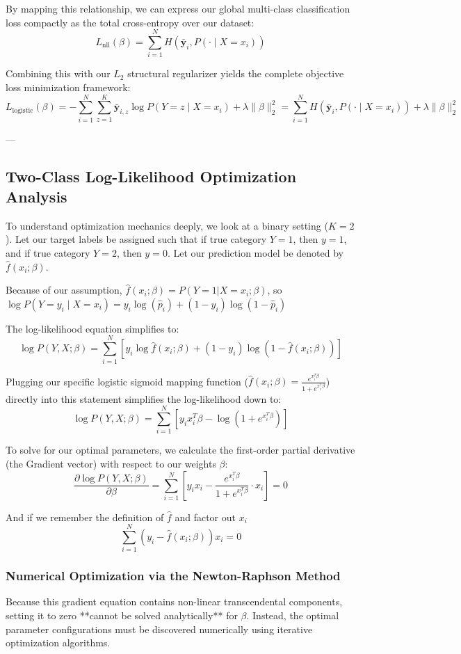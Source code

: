 \documentclass{article}
\begin{document}
By mapping this relationship, we can express our global multi-class classification loss compactly as the total cross-entropy over our dataset:
\[ L_{\text{nll}}(\beta) = \sum_{i=1}^{N} H\left(\mathbf{\bar{y}}_i, P(\cdot \mid X = x_i)\right) \]



Combining this with our $L_2$ structural regularizer yields the complete objective loss minimization framework:
\[ L_{\text{logistic}}(\beta) = -\sum_{i=1}^{N} \sum_{z=1}^{K} \mathbf{\bar{y}}_{i,z} \log P(Y = z \mid X = x_i) + \lambda \|\beta\|_2^2 = \sum_{i=1}^{N} H\left(\mathbf{\bar{y}}_i, P(\cdot \mid X = x_i)\right) + \lambda \|\beta\|_2^2 \]

---

\subsection{Two-Class Log-Likelihood Optimization Analysis}
To understand optimization mechanics deeply, we look at a binary setting ($K=2$). Let our target labels be assigned such that if true category $Y = 1$, then $y = 1$, and if true category $Y = 2$, then $y = 0$. Let our prediction model be denoted by $\hat{f}(x_i; \beta)$. 

Because of our assumption, $\hat{f}(x_i; \beta) = P(Y = 1 | X = x_i ; \beta)$, so $\log P(Y = y_i \mid X = x_i) = y_i \log(\hat{p}_i) + (1 - y_i) \log(1 - \hat{p}_i)$

The log-likelihood equation simplifies to:
\[ \log P(Y, X; \beta) = \sum_{i=1}^{N} \left[ y_i \log \hat{f}(x_i; \beta) + (1 - y_i) \log(1 - \hat{f}(x_i; \beta)) \right] \]

Plugging our specific logistic sigmoid mapping function ($\hat{f}(x_i; \beta) = \frac{e^{x_i^T\beta}}{1+e^{x_i^T\beta}}$) directly into this statement simplifies the log-likelihood down to:
\[ \log P(Y, X; \beta) = \sum_{i=1}^{N} \left[ y_i x_i^T\beta - \log\left(1 + e^{x_i^T\beta}\right) \right] \]

To solve for our optimal parameters, we calculate the first-order partial derivative (the Gradient vector) with respect to our weights $\beta$:
\[ \frac{\partial \log P(Y, X; \beta)}{\partial \beta} = \sum_{i=1}^{N} \left[ y_i x_i - \frac{e^{x_i^T\beta}}{1 + e^{x_i^T\beta}} \cdot x_i \right] = 0 \]

And if we remember the definition of $\hat{f}$ and factor out $x_i$
\[ \sum_{i=1}^{N} \left( y_i - \hat{f}(x_i; \beta) \right) x_i = 0 \]

\subsubsection{Numerical Optimization via the Newton-Raphson Method}
Because this gradient equation contains non-linear transcendental components, setting it to zero **cannot be solved analytically** for $\beta$. Instead, the optimal parameter configurations must be discovered numerically using iterative optimization algorithms.
\end{document}

